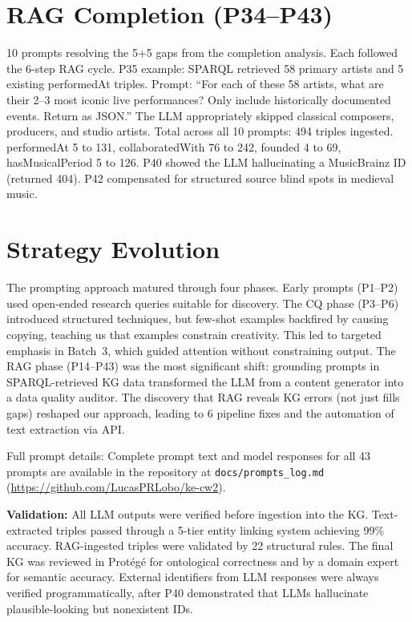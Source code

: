 \documentclass[11pt,a4paper]{article}
\begin{document}
\section{RAG Completion (P34--P43)}

10 prompts resolving the 5+5 gaps from the completion analysis. Each followed the 6-step RAG cycle. P35 example: SPARQL retrieved 58 primary artists and 5 existing performedAt triples. Prompt: ``For each of these 58 artists, what are their 2--3 most iconic live performances? Only include historically documented events. Return as JSON.'' The LLM appropriately skipped classical composers, producers, and studio artists. Total across all 10 prompts: 494 triples ingested. performedAt 5 to 131, collaboratedWith 76 to 242, founded 4 to 69, hasMusicalPeriod 5 to 126. P40 showed the LLM hallucinating a MusicBrainz ID (returned 404). P42 compensated for structured source blind spots in medieval music.

\section{Strategy Evolution}

The prompting approach matured through four phases. Early prompts (P1--P2) used open-ended research queries suitable for discovery. The CQ phase (P3--P6) introduced structured techniques, but few-shot examples backfired by causing copying, teaching us that examples constrain creativity. This led to targeted emphasis in Batch~3, which guided attention without constraining output. The RAG phase (P14--P43) was the most significant shift: grounding prompts in SPARQL-retrieved KG data transformed the LLM from a content generator into a data quality auditor. The discovery that RAG reveals KG errors (not just fills gaps) reshaped our approach, leading to 6 pipeline fixes and the automation of text extraction via API.

Full prompt details: Complete prompt text and model responses for all 43 prompts are available in the repository at \texttt{docs/prompts\_log.md} (\url{https://github.com/LucasPRLobo/ke-cw2}).

\textbf{Validation:} All LLM outputs were verified before ingestion into the KG. Text-extracted triples passed through a 5-tier entity linking system achieving 99\% accuracy. RAG-ingested triples were validated by 22 structural rules. The final KG was reviewed in Prot\'{e}g\'{e} for ontological correctness and by a domain expert for semantic accuracy. External identifiers from LLM responses were always verified programmatically, after P40 demonstrated that LLMs hallucinate plausible-looking but nonexistent IDs.
\end{document}
